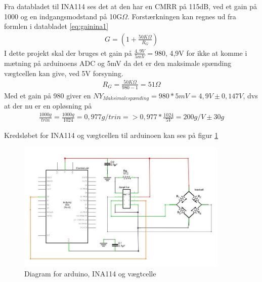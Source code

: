 Fra databladet til INA114 ses det at den har en CMRR på 115dB, ved et gain på 1000 og en indgangsmodstand på 10G$\Omega$. Forstærkningen kan regnes ud fra formlen i databladet \ref{eq:gainina1}
\begin{align}
 G=(1+\frac{50K\Omega}{R_{G}})
 \label{eq:gainina1}
 \end{align} 
 I dette projekt skal der bruges et gain på $\frac{4,9V}{5mV}=980$, 4,9V for ikke at komme i mætning på arduinoens ADC og 5mV da det er den maksimale spænding vægtcellen kan give, ved 5V forsyning.
 \begin{align}
 R_{G}=\frac{50K\Omega}{980-1}=51\Omega
 \label{eq:gainina2}
 \end{align}
Med et gain på 980 giver en $NY_{Maksimalespænding}=980*5mV=4,9V \pm0,147V$, dvs at der nu er en opløsning på
\begin{align}
 \frac{1000g}{trin}=\frac{1000g}{1024}=0,977g/trin=>0,977*\frac{1024}{5V}=200g/V \pm30g
 \label{eq:gainina3}
 \end{align}
 
 Kredsløbet for INA114 og vægtcellen til arduinoen kan ses på figur \ref{fig:loadcelldiagram}
 
  \begin{figure}[H]
	\centering
	\includegraphics[width=0.9\textwidth]{billeder/Hardware/diagrammer/loadcelldiagram.JPG}
	\caption{Diagram for arduino, INA114 og vægtcelle}
	\label{fig:loadcelldiagram}
\end{figure}

